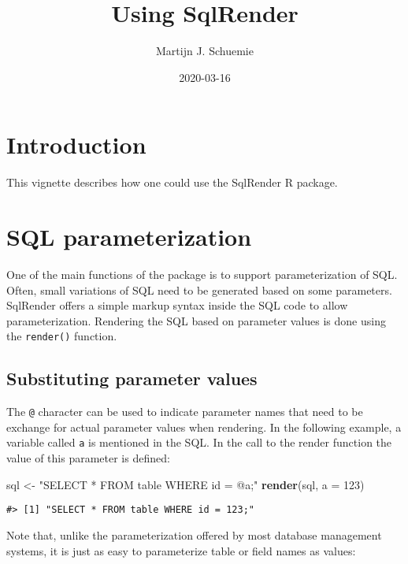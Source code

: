 \documentclass[
]{article}
\title{Using SqlRender}
\author{Martijn J. Schuemie}
\date{2020-03-16}
\newenvironment{Shaded}{\begin{snugshade}}{\end{snugshade}}
\newcommand{\DataTypeTok}[1]{\textcolor[rgb]{0.13,0.29,0.53}{#1}}
\newcommand{\DecValTok}[1]{\textcolor[rgb]{0.00,0.00,0.81}{#1}}
\newcommand{\KeywordTok}[1]{\textcolor[rgb]{0.13,0.29,0.53}{\textbf{#1}}}
\newcommand{\NormalTok}[1]{#1}
\newcommand{\StringTok}[1]{\textcolor[rgb]{0.31,0.60,0.02}{#1}}
\begin{document}
\maketitle

{
\setcounter{tocdepth}{2}
\tableofcontents
}
\hypertarget{introduction}{%
\section{Introduction}\label{introduction}}

This vignette describes how one could use the SqlRender R package.

\hypertarget{sql-parameterization}{%
\section{SQL parameterization}\label{sql-parameterization}}

One of the main functions of the package is to support parameterization
of SQL. Often, small variations of SQL need to be generated based on
some parameters. SqlRender offers a simple markup syntax inside the SQL
code to allow parameterization. Rendering the SQL based on parameter
values is done using the \texttt{render()} function.

\hypertarget{substituting-parameter-values}{%
\subsection{Substituting parameter
values}\label{substituting-parameter-values}}

The \texttt{@} character can be used to indicate parameter names that
need to be exchange for actual parameter values when rendering. In the
following example, a variable called \texttt{a} is mentioned in the SQL.
In the call to the render function the value of this parameter is
defined:

\begin{Shaded}
\begin{Highlighting}[]
\NormalTok{sql <-}\StringTok{ "SELECT * FROM table WHERE id = @a;"}
\KeywordTok{render}\NormalTok{(sql, }\DataTypeTok{a =} \DecValTok{123}\NormalTok{)}
\end{Highlighting}
\end{Shaded}

\begin{verbatim}
#> [1] "SELECT * FROM table WHERE id = 123;"
\end{verbatim}

Note that, unlike the parameterization offered by most database
management systems, it is just as easy to parameterize table or field
names as values:
\end{document}

